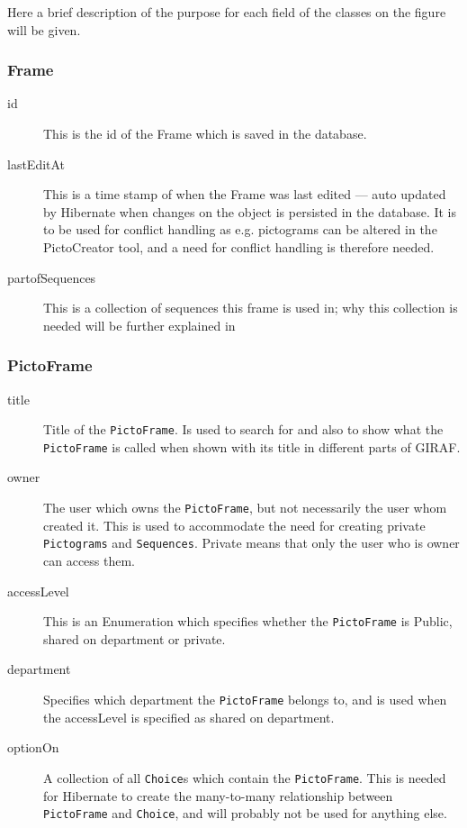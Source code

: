 Here a brief description of the purpose for each field of the classes on the figure will be given.
\subsubsection*{Frame}
	\begin{description}
		\item[id] This is the id of the Frame which is saved in the database.
		\item[lastEditAt] This is a time stamp of when the Frame was last edited --- auto updated by Hibernate when changes on the object is persisted in the database.
		It is to be used for conflict handling as e.g. pictograms can be altered in the PictoCreator tool, and a need for conflict handling is therefore needed.
		\item[partofSequences] This is a collection of sequences this frame is used in; why this collection is needed will be further explained in 
	\end{description}

\subsubsection*{PictoFrame}
	\begin{description}
		\item[title] Title of the \texttt{PictoFrame}. Is used to search for and also to show what the \texttt{PictoFrame} is called when shown with its title in different parts of GIRAF.
		\item[owner] The user which owns the \texttt{PictoFrame}, but not necessarily the user whom created it.
		This is used to accommodate the need for creating private \texttt{Pictograms} and \texttt{Sequences}.
		Private means that only the user who is owner can access them.
		\item[accessLevel] This is an Enumeration which specifies whether the \texttt{PictoFrame} is Public, shared on department or private.
		\item[department] Specifies which department the \texttt{PictoFrame} belongs to, and is used when the accessLevel is specified as shared on department.
		\item[optionOn] A collection of all \texttt{Choice}s which contain the \texttt{PictoFrame}.
		This is needed for Hibernate to create the many-to-many relationship between \texttt{PictoFrame} and \texttt{Choice}, and will probably not be used for anything else.
	\end{description}

